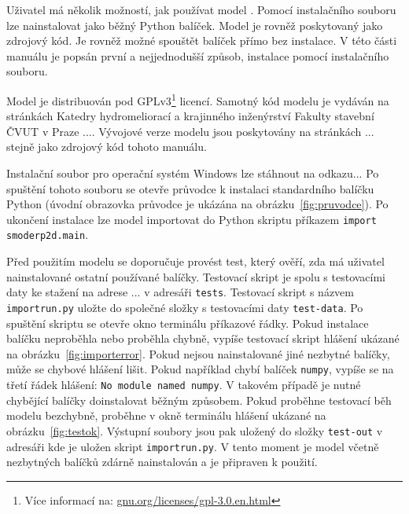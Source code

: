   
  Uživatel má několik možností, jak používat model \smod. Pomocí instalačního souboru lze nainstalovat \smod jako běžný Python balíček. Model \smod je rovněž poskytovaný jako zdrojový kód. Je rovněž možné spouštět balíček přímo bez instalace. V této části manuálu je popsán první a nejjednodušší způsob, instalace pomocí instalačního souboru. 
  
  Model \smod je distribuován pod GPLv3\footnote{Více informací na: \href{https://www.gnu.org/licenses/gpl-3.0.en.html}{gnu.org/licenses/gpl-3.0.en.html}} licencí. Samotný kód modelu \smod je vydáván na stránkách  Katedry  hydromeliorací a krajinného inženýrství Fakulty stavební ČVUT v Praze .... Vývojové verze modelu jsou poskytovány na stránkách ... stejně jako zdrojový kód tohoto manuálu. 
  
  Instalační soubor pro operační systém Windows lze stáhnout na odkazu... Po spuštění tohoto souboru se otevře průvodce k instalaci standardního balíčku Python (úvodní obrazovka průvodce je ukázána na obrázku~\ref{fig:pruvodce}). Po ukončení instalace lze model \smod importovat do Python skriptu příkazem {\tt import smoderp2d.main}. 

  Před použitím modelu se doporučuje provést test, který ověří, zda má uživatel nainstalované ostatní používané balíčky. Testovací skript je spolu s testovacími daty ke stažení na adrese ... v adresáři {\tt tests}. Testovací skript s názvem {\tt importrun.py} uložte do společné složky s testovacími daty {\tt test-data}. Po spuštění skriptu se otevře okno terminálu příkazové řádky. Pokud instalace balíčku \smod neproběhla nebo proběhla chybně, vypíše testovací skript hlášení ukázané na obrázku~\ref{fig:importerror}. Pokud nejsou nainstalované jiné nezbytné balíčky, může se chybové hlášení lišit. Pokud například chybí balíček {\tt numpy}, vypíše se na třetí řádek hlášení: {\tt No module named numpy}. V takovém případě je nutné chybějící balíčky doinstalovat běžným způsobem. Pokud proběhne testovací běh modelu \smod bezchybně, proběhne v okně terminálu hlášení ukázané na obrázku~\ref{fig:testok}. Výstupní soubory jsou pak uložený do složky {\tt test-out} v adresáři kde je uložen skript {\tt importrun.py}. V tento moment je model \smod včetně nezbytných balíčků zdárně nainstalován a je připraven k použití.
  
